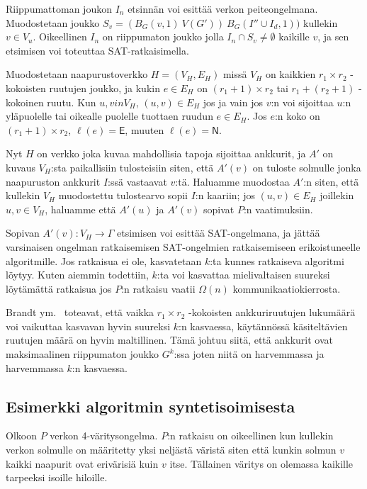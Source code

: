 \documentclass[12pt,finnish]{tktltiki2}
\theoremstyle{definition}
\theoremstyle{remark}
\begin{document}
Riippumattoman joukon $I_n$ etsinnän voi esittää verkon peiteongelmana. Muodostetaan joukko $S_v = (B_G(v, 1) \ V(G')) \ B_G(I'' \cup I_d, 1))$ kullekin $v \in V_u$. Oikeellinen $I_n$ on riippumaton joukko jolla $I_n \cap S_v \neq \emptyset$ kaikille $v$, ja sen etsimisen voi toteuttaa SAT-ratkaisimella.

Muodostetaan naapurustoverkko $H = (V_H, E_H)$ missä $V_H$ on kaikkien $r_1 \times r_2$ -kokoisten ruutujen joukko, ja kukin $e \in E_H$ on $(r_1 + 1) \times r_2$ tai $r_1 + (r_2 + 1)$ -kokoinen ruutu. Kun $u, v in V_H$, $(u, v) \in E_H$ jos ja vain jos $v$:n voi sijoittaa $u$:n yläpuolelle tai oikealle puolelle tuottaen ruudun $e \in E_H$. Jos $e$:n koko on $(r_1 + 1) \times r_2$, $\ell(e) = \mathsf{E}$, muuten $\ell(e) = \mathsf{N}$. 

Nyt $H$ on verkko joka kuvaa mahdollisia tapoja sijoittaa ankkurit, ja $A'$ on kuvaus $V_H$:sta paikallisiin tulosteisiin siten, että $A'(v)$ on tuloste solmulle jonka naapuruston ankkurit $I$:ssä vastaavat $v$:tä. Haluamme muodostaa $A'$:n siten, että kullekin $V_H$ muodostettu tulostearvo sopii $I$:n kaariin; jos $(u, v) \in E_H$ joillekin $u, v \in V_H$, haluamme että $A'(u)$ ja $A'(v)$ sopivat $P$:n vaatimuksiin.

Sopivan $A'(v): V_H \rightarrow \Gamma$ etsimisen voi esittää SAT-ongelmana, ja jättää varsinaisen ongelman ratkaisemisen SAT-ongelmien ratkaisemiseen erikoistuneelle algoritmille. Jos ratkaisua ei ole, kasvatetaan $k$:ta kunnes ratkaiseva algoritmi löytyy. Kuten aiemmin todettiin, $k$:ta voi kasvattaa mielivaltaisen suureksi löytämättä ratkaisua jos $P$:n ratkaisu vaatii $\Omega(n)$ kommunikaatiokierrosta.

Brandt ym.~\cite{brandt} toteavat, että vaikka $r_1 \times r_2$ -kokoisten ankkuriruutujen lukumäärä voi vaikuttaa kasvavan hyvin suureksi $k$:n kasvaessa, käytännössä käsiteltävien ruutujen määrä on hyvin maltillinen. Tämä johtuu siitä, että ankkurit ovat maksimaalinen riippumaton joukko $G^k$:ssa joten niitä on harvemmassa ja harvemmassa $k$:n kasvaessa.

\subsection{Esimerkki algoritmin syntetisoimisesta}
Olkoon $P$ verkon 4-väritysongelma. $P$:n ratkaisu on oikeellinen kun kullekin verkon solmulle on määritetty yksi neljästä väristä siten että kunkin solmun $v$ kaikki naapurit ovat erivärisiä kuin $v$ itse. Tällainen väritys on olemassa kaikille tarpeeksi isoille hiloille.
\end{document}
